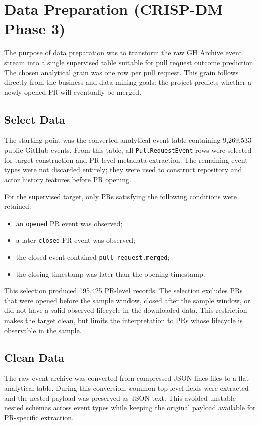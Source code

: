 \clearpage
\section{Data Preparation (CRISP-DM Phase 3)}

The purpose of data preparation was to transform the raw GH Archive event stream into a single supervised
table suitable for pull request outcome prediction. The chosen analytical grain was one row per pull request.
This grain follows directly from the business and data mining goals: the project predicts whether a newly
opened PR will eventually be merged.

\subsection{Select Data}

The starting point was the converted analytical event table containing 9,269,533 public GitHub events. From
this table, all \texttt{PullRequestEvent} rows were selected for target construction and PR-level metadata
extraction. The remaining event types were not discarded entirely; they were used to construct repository and
actor history features before PR opening.

For the supervised target, only PRs satisfying the following conditions were retained:

\begin{itemize}
    \item an \texttt{opened} PR event was observed;
    \item a later \texttt{closed} PR event was observed;
    \item the closed event contained \texttt{pull\_request.merged};
    \item the closing timestamp was later than the opening timestamp.
\end{itemize}

This selection produced 195,425 PR-level records. The selection excludes PRs that were opened before the
sample window, closed after the sample window, or did not have a valid observed lifecycle in the downloaded
data. This restriction makes the target clean, but limits the interpretation to PRs whose lifecycle is
observable in the sample.

\subsection{Clean Data}

The raw event archive was converted from compressed JSON-lines files to a flat analytical table. During this
conversion, common top-level fields were extracted and the nested payload was preserved as JSON text. This
avoided unstable nested schemas across event types while keeping the original payload available for
PR-specific extraction.

